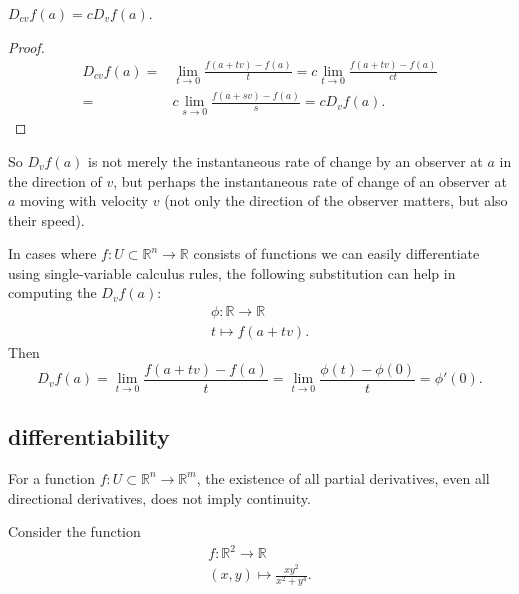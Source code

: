 \documentclass[12pt]{article}
\begin{document}
\begin{proposition}
	$D_{cv}f(a) = cD_vf(a)$.
\end{proposition}
\begin{proof}
	\begin{align*}
		D_{cv}f(a) =& \lim_{t\to 0} \frac{f(a+tv) - f(a)}{t} = c\lim_{t\to 0}\frac{f(a+tv) - f(a)}{ct} \\
		=& c\lim_{s\to 0}\frac{f(a+sv) - f(a)}{s} = c D_vf(a).
	\end{align*}
\end{proof}

\begin{remark}
	So $D_vf(a)$ is not merely the instantaneous rate of change by an observer at $a$ in the direction of $v$, but perhaps the instantaneous rate of change of an observer at $a$ moving with velocity $v$ (not only the direction of the observer matters, but also their speed).
\end{remark}

\begin{remark}
	In cases where $f:U\subset\mathbb{R}^n \to \mathbb{R}$ consists of functions we can easily differentiate using single-variable calculus rules, the following substitution can help in computing the $D_vf(a)$:
	\begin{gather*}
		\phi: \mathbb{R} \to \mathbb{R} \\
		t \mapsto f(a+tv).
	\end{gather*}
	Then 
	\begin{equation*}
		D_vf(a) = \lim_{t\to 0}\frac{f(a+tv)-f(a)}{t} = \lim_{t\to 0}\frac{\phi(t)-\phi(0)}{t} = \phi'(0).
	\end{equation*}
\end{remark}


\subsection{differentiability} %

\begin{example}
	For a function $f:U\subset\mathbb{R}^n\to\mathbb{R}^m$, the existence of all partial derivatives, even all directional derivatives, does not imply continuity.

	Consider the function 
	\begin{gather*}
		f:\mathbb{R}^2 \to \mathbb{R} \\
		(x, y) \mapsto \frac{xy^2}{x^2+y^4}.
	\end{gather*}

\end{example}
\end{document}
